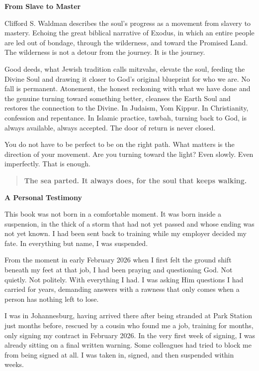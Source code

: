 \textbf{From Slave to Master}

Clifford S. Waldman describes the soul's progress as a movement from
slavery to mastery. Echoing the great biblical narrative of Exodus, in
which an entire people are led out of bondage, through the wilderness,
and toward the Promised Land. The wilderness is not a detour from the
journey. It is the journey.

Good deeds, what Jewish tradition calls mitzvahs, elevate the soul,
feeding the Divine Soul and drawing it closer to God's original
blueprint for who we are. No fall is permanent. Atonement, the honest
reckoning with what we have done and the genuine turning toward
something better, cleanses the Earth Soul and restores the connection to
the Divine. In Judaism, Yom Kippur. In Christianity, confession and
repentance. In Islamic practice, tawbah, turning back to God, is always
available, always accepted. The door of return is never closed.

You do not have to be perfect to be on the right path. What matters is
the direction of your movement. Are you turning toward the light? Even
slowly. Even imperfectly. That is enough.

\begin{quote}
\textbf{The sea parted. It always does, for the soul that keeps
walking.}
\end{quote}

\textbf{A Personal Testimony}

This book was not born in a comfortable moment. It was born inside a
suspension, in the thick of a storm that had not yet passed and whose
ending was not yet known. I had been sent back to training while my
employer decided my fate. In everything but name, I was suspended.

From the moment in early February 2026 when I first felt the ground
shift beneath my feet at that job, I had been praying and questioning
God. Not quietly. Not politely. With everything I had. I was asking Him
questions I had carried for years, demanding answers with a rawness that
only comes when a person has nothing left to lose.

I was in Johannesburg, having arrived there after being stranded at Park
Station just months before, rescued by a cousin who found me a job,
training for months, only signing my contract in February 2026. In the
very first week of signing, I was already sitting on a final written
warning. Some colleagues had tried to block me from being signed at all.
I was taken in, signed, and then suspended within weeks.

